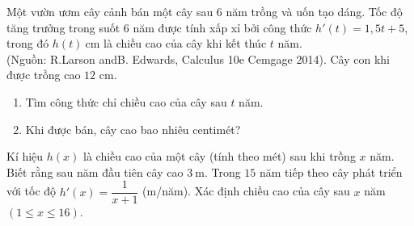 \begin{bt}%
	Một  vườn ươm cây cảnh bán một cây sau $6$ năm trồng và uốn tạo dáng. Tốc độ tăng trưởng trong suốt $6$ năm được tính xấp xỉ bởi công thức $h'(t)=1,5t+5$, trong đó $h(t)~\mathrm{cm}$ là chiều cao của cây khi kết thúc $t$ năm.\\
	(Nguồn: R.Larson andB. Edwards,  Calculus 10e Cemgage 2014). Cây con khi được trồng cao $12$ cm.
	\begin{enumerate}
		 \item Tìm công thức chỉ chiều cao của cây sau $t$ năm.
		\item Khi được bán,  cây cao bao nhiêu centimét?
	\end{enumerate}
\end{bt}

\begin{bt}%
	Kí hiệu $h\left(x \right)$ là chiều cao của một cây (tính theo mét) sau khi trồng $x$ năm. Biết rằng sau năm đầu tiên cây cao $3~\mathrm{m}$. Trong $15$ năm tiếp theo cây phát triển với tốc độ $h'(x)=\dfrac{1}{x+1}$ (m/năm). Xác định chiều cao của cây sau  $x$ năm $\left(1\le x\le 16\right)$.
\end{bt}

